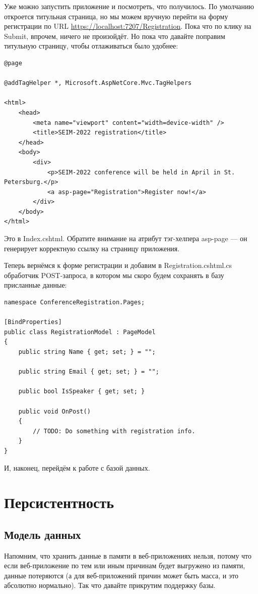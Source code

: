 \documentclass[a5paper]{article}
\begin{document}
Уже можно запустить приложение и посмотреть, что получилось. По умолчанию откроется титульная страница, но мы можем вручную перейти на форму регистрации по URL \url{https://localhost:7207/Registration}. Пока что по клику на Submit, впрочем, ничего не произойдёт. Но пока что давайте поправим титульную страницу, чтобы отлаживаться было удобнее:

\begin{verbatim}
@page

@addTagHelper *, Microsoft.AspNetCore.Mvc.TagHelpers

<html>
    <head>
        <meta name="viewport" content="width=device-width" />
        <title>SEIM-2022 registration</title>
    </head>
    <body>
        <div>
            <p>SEIM-2022 conference will be held in April in St. Petersburg.</p>
            <a asp-page="Registration">Register now!</a>
        </div>
    </body>
</html>
\end{verbatim}

Это в Index.cshtml. Обратите внимание на атрибут тэг-хелпера asp-page --- он генерирует корректную ссылку на страницу приложения.

Теперь вернёмся к форме регистрации и добавим в Registration.cshtml.cs обработчик POST-запроса, в котором мы скоро будем сохранять в базу присланные данные:

\begin{verbatim}
namespace ConferenceRegistration.Pages;

[BindProperties]
public class RegistrationModel : PageModel
{
    public string Name { get; set; } = "";

    public string Email { get; set; } = "";

    public bool IsSpeaker { get; set; }

    public void OnPost()
    {
        // TODO: Do something with registration info.
    }
}
\end{verbatim}

И, наконец, перейдём к работе с базой данных.

\section{Персистентность}

\subsection{Модель данных}

Напомним, что хранить данные в памяти в веб-приложениях нельзя, потому что если веб-приложение по тем или иным причинам будет выгружено из памяти, данные потеряются (а для веб-приложений причин может быть масса, и это абсолютно нормально). Так что давайте прикрутим поддержку базы. 
\end{document}
